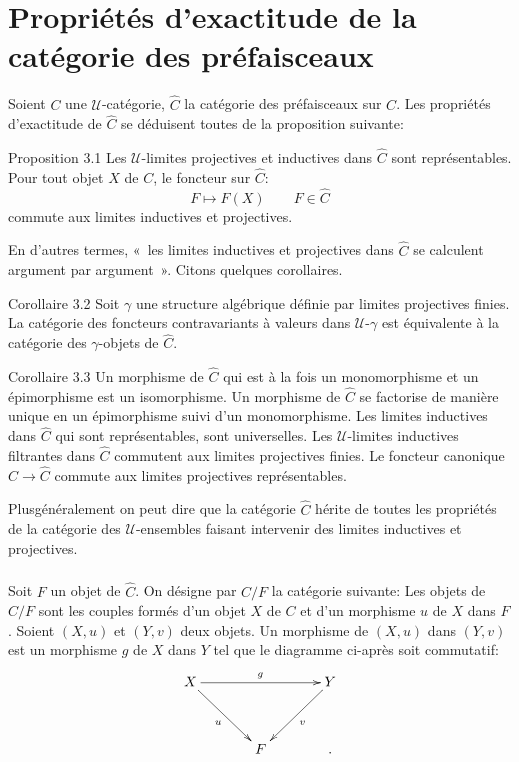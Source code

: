 \documentclass[10pt]{../fichiers-configuration-latex/smfart}
\begin{document}
\section{Propriétés d'exactitude de la catégorie des préfaisceaux}

Soient $C$ une $𝒰$-catégorie, $\widehat{C}$ la
catégorie des préfaisceaux sur $C$. Les propriétés d'exactitude de
$\widehat{C}$ se déduisent toutes de la proposition
suivante:

\begin{enonce*}{Proposition 3.1}
Les $𝒰$-limites projectives et inductives dans
$\widehat{C}$ sont représentables. Pour tout objet $X$
de $C$, le foncteur sur $\widehat{C}$:
$$
F\longmapsto F(X)\qquad F\in \widehat{C}
$$
commute aux limites inductives et projectives.

En d'autres termes, « les limites inductives et projectives dans
$\widehat{C}$ se calculent argument par argument ».
Citons quelques corollaires.
\end{enonce*}

\begin{enonce*}{Corollaire 3.2}
Soit $\gamma$ une structure algébrique définie par limites
projectives finies. La catégorie des foncteurs contravariants à
valeurs dans $𝒰$-$\gamma$ est équivalente à la catégorie des
$\gamma$-objets de $\widehat{C}$.
\end{enonce*}

\begin{enonce*}{Corollaire 3.3}
Un morphisme de $\widehat{C}$ qui est à la fois un
monomorphisme et un épimorphisme est un isomorphisme. Un morphisme
de $\widehat{C}$ se factorise de manière unique en un
épimorphisme suivi d'un monomorphisme. Les limites inductives dans
$\widehat{C}$ qui sont représentables, sont
universelles. Les $𝒰$-limites inductives filtrantes dans
$\widehat{C}$ commutent aux limites projectives
finies. Le foncteur canonique $C\rightarrow
\widehat{C}$ commute aux limites projectives
représentables.
\end{enonce*}

Plus\pageoriginale généralement on peut dire que la catégorie
$\widehat{C}$ hérite de toutes les propriétés de la
catégorie des $𝒰$-ensembles faisant intervenir des limites
inductives et projectives.

\setcounter{subsection}{4} \setcounter{subsubsection}{-1}
\subsubsection{}
Soit $F$ un objet de $\widehat{C}$. On désigne par
$C/F$ la catégorie suivante: Les objets de $C/F$ sont les couples
formés d'un objet $X$ de $C$ et d'un morphisme $u$ de $X$ dans $F$.
Soient $(X,u)$ et $(Y,v)$ deux objets. Un morphisme de $(X,u)$ dans
$(Y,v)$ est un morphisme $g$ de $X$ dans $Y$ tel que le diagramme
ci-après soit commutatif:
\[
\xymatrix@=1.25cm{
X \ar[rr]^{g}\ar[rd]_{u}&   & Y\ar[ld]^{v}\\
            & F &.
}
\]
\end{document}
